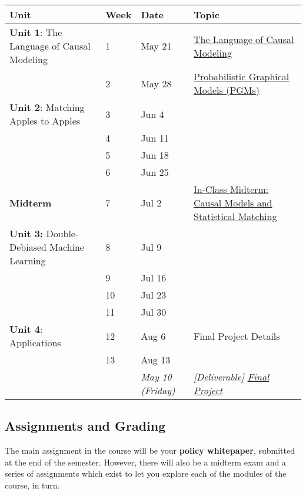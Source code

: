 \documentclass[
]{scrartcl}
\begin{document}
\begin{longtable}[]{@{}llll@{}}
\toprule\noalign{}
Unit & Week & Date & Topic \\
\midrule\noalign{}
\endhead
\bottomrule\noalign{}
\endlastfoot
\textbf{Unit 1}: The Language of Causal Modeling & 1 & May 21 &
\href{./w01/}{The Language of Causal Modeling} \\
& 2 & May 28 & \href{./w02/}{Probabilistic Graphical Models (PGMs)} \\
\textbf{Unit 2}: Matching Apples to Apples & 3 & Jun 4 &
\href{./w03/}{} \\
& 4 & Jun 11 & \href{./w04/}{} \\
& 5 & Jun 18 & \href{./w05/}{} \\
& 6 & Jun 25 & \href{./w06/}{} \\
\textbf{Midterm} & 7 & Jul 2 & \href{./w07/}{In-Class Midterm: Causal
Models and Statistical Matching} \\
\textbf{Unit 3:} Double-Debiased Machine Learning & 8 & Jul 9 &
\href{./w08/}{} \\
& 9 & Jul 16 & \href{./w09/}{} \\
& 10 & Jul 23 & \href{./w10/}{} \\
& 11 & Jul 30 & \href{./w11/}{} \\
\textbf{Unit 4}: Applications & 12 & Aug 6 & Final Project Details \\
& 13 & Aug 13 & \\
& & \emph{May 10 (Friday)} & \emph{{[}Deliverable{]}
\href{./final.qmd}{Final Project}} \\
\end{longtable}

\subsection{Assignments and Grading}\label{assignments-and-grading}

The main assignment in the course will be your \textbf{policy
whitepaper}, submitted at the end of the semester. However, there will
also be a midterm exam and a series of assignments which exist to let
you explore each of the modules of the course, in turn.
\end{document}

